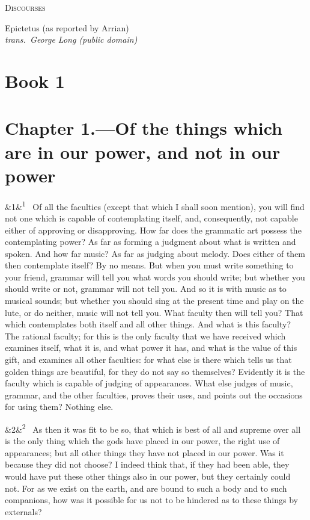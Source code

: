\documentclass[12pt]{article}
\newcommand{\work}[1]{\begin{center}\LARGE\scshape #1\end{center}}
\newcommand{\attrib}[2]{\begin{center}\large #1\\[2pt]\small\itshape trans.\ #2\end{center}\vspace{1em}}
\newcommand{\para}[1][]{\par\noindent\ifx&#1&\else\textsuperscript{\footnotesize #1}~\fi}
\begin{document}
\work{Discourses}
\attrib{Epictetus (as reported by Arrian)}{George Long (public domain)}

\section*{Book 1}

\section*{Chapter 1.---Of the things which are in our power, and not in our power}

\para[1] Of all the faculties (except that which I shall soon mention), you will find not one which is capable of contemplating itself, and, consequently, not capable either of approving or disapproving. How far does the grammatic art possess the contemplating power? As far as forming a judgment about what is written and spoken. And how far music? As far as judging about melody. Does either of them then contemplate itself? By no means. But when you must write something to your friend, grammar will tell you what words you should write; but whether you should write or not, grammar will not tell you. And so it is with music as to musical sounds; but whether you should sing at the present time and play on the lute, or do neither, music will not tell you. What faculty then will tell you? That which contemplates both itself and all other things. And what is this faculty? The rational faculty; for this is the only faculty that we have received which examines itself, what it is, and what power it has, and what is the value of this gift, and examines all other faculties: for what else is there which tells us that golden things are beautiful, for they do not say so themselves? Evidently it is the faculty which is capable of judging of appearances. What else judges of music, grammar, and the other faculties, proves their uses, and points out the occasions for using them? Nothing else.

\para[2] As then it was fit to be so, that which is best of all and supreme over all is the only thing which the gods have placed in our power, the right use of appearances; but all other things they have not placed in our power. Was it because they did not choose? I indeed think that, if they had been able, they would have put these other things also in our power, but they certainly could not. For as we exist on the earth, and are bound to such a body and to such companions, how was it possible for us not to be hindered as to these things by externals?
\end{document}
